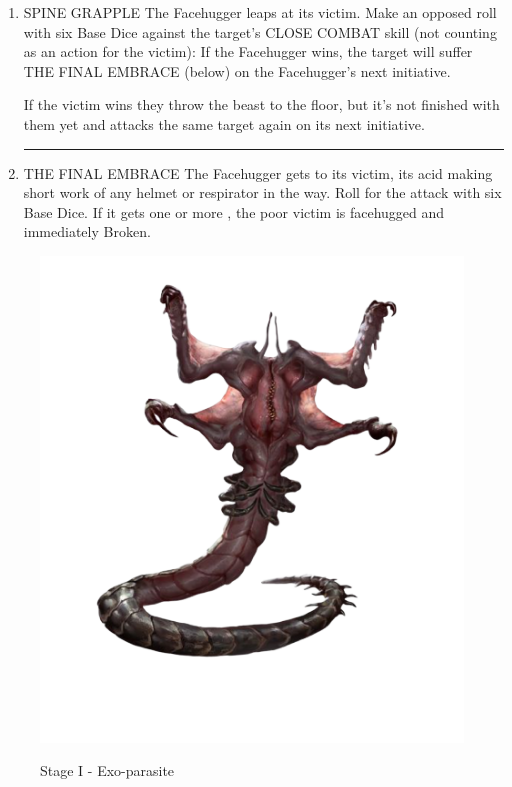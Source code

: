 \begin{rpg-commentbox}{}
\begin{enumerate}
            3–4: The victim’s arms get hopelessly tangled in the beast’s tail—they cannot use any held items and must make a Panic Roll.
            
            5–6: The Facehugger wraps its tail around the target’s neck, choking them—they suffer the effects of DROWNING and must make a Panic Roll. 

        \par\noindent\rule{.9\textwidth}{0.4pt}

        \item SPINE GRAPPLE The Facehugger leaps at its victim. Make an opposed roll with six Base Dice
        against the target’s CLOSE COMBAT skill (not counting as an action for the victim):
            If the Facehugger wins, the target will suffer THE FINAL EMBRACE (below) on the Facehugger’s next initiative.

            If the victim wins they throw the beast to the floor, but it’s not finished with them
        yet and attacks the same target again on its next initiative. 

        \par\noindent\rule{.9\textwidth}{0.4pt}

        \item THE FINAL EMBRACE The Facehugger gets to its victim, its acid making short work of any helmet or respirator in the way. Roll for the attack with six Base Dice. If it gets one or more ,
        the poor victim is facehugged and immediately Broken.
    \end{enumerate}

\end{rpg-commentbox}


\begin{figure}
    \centering
    \includegraphics[width=.45\textwidth]{img/stage-I-bg.png}
    \label{fig:stage-1}
    \caption*{Stage I - Exo-parasite}
\end{figure}

